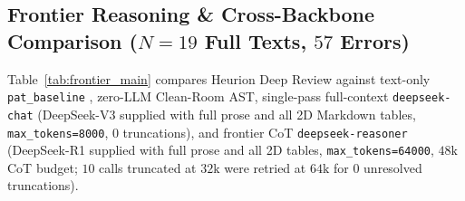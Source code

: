 \documentclass[11pt,a4paper]{article}
\begin{document}
\subsection{Frontier Reasoning \& Cross-Backbone Comparison (\texorpdfstring{$N=19$}{N=19} Full Texts, \texorpdfstring{$57$}{57} Errors)}
Table~\ref{tab:frontier_main} compares Heurion Deep Review against text-only \texttt{pat\_baseline} \cite{googlepat2026}, zero-LLM Clean-Room AST, single-pass full-context \texttt{deepseek-chat} (DeepSeek-V3 supplied with full prose and all 2D Markdown tables, \texttt{max\_tokens=8000}, $0$ truncations), and frontier CoT \texttt{deepseek-reasoner} (DeepSeek-R1 supplied with full prose and all 2D tables, \texttt{max\_tokens=64000}, $48\text{k}$ CoT budget; $10$ calls truncated at $32\text{k}$ were retried at $64\text{k}$ for $0$ unresolved truncations).
\end{document}
